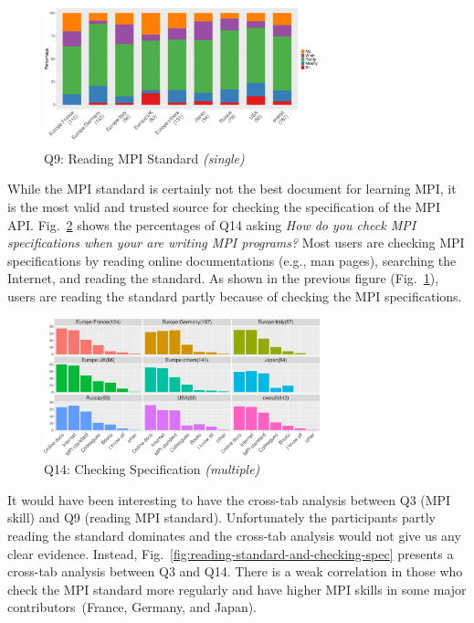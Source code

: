 \documentclass[preprint,5p,times]{elsarticle}
\def\myquote#1{{\it #1}}
\newcommand{\revision}[2]{{\color{blue}#2}}
\def\mcountries{major contributors\xspace{}}%
\begin{document}
\begin{figure}[tb]
\begin{center}
\includegraphics[width=8.0cm]{R-scripts/Q9.pdf}
\vspace{-1.5mm}
\caption{Q9: Reading MPI Standard {\it(single)}}
\label{fig:reading-standard}
\vspace{-3mm}%
\end{center}
\end{figure}

While the MPI standard is certainly not the best document for learning MPI, it
is the most valid and trusted source for checking the specification of the MPI
API. Fig.~\ref{fig:checking-spec} shows the percentages of Q14 asking
\myquote{How do you check MPI specifications when your are writing MPI
programs?} Most users are checking MPI specifications by reading online
documentations (e.g., man pages), searching the Internet, and reading the standard.
As shown in the previous figure (Fig.~\ref{fig:reading-standard}), users are
reading the standard partly because of checking the MPI specifications.

\begin{figure}[tb]
\begin{center}
\includegraphics[width=8.0cm]{R-scripts/Q14.pdf}
\vspace{-1.5mm}
\caption{Q14: Checking Specification {\it(multiple)}}
\label{fig:checking-spec}
\vspace{-3mm}%
\end{center}
\end{figure}

It would have been interesting to have the cross-tab analysis between Q3 (MPI
skill) and Q9 (reading MPI standard). Unfortunately the participants
\revision{reading the standard partly}{partly reading the standard} dominates and the cross-tab analysis would not give us any clear
evidence.
%
Instead, Fig.~\ref{fig:reading-standard-and-checking-spec} presents a cross-tab
analysis between Q3 and Q14. There is a weak correlation in those who
check the MPI standard more regularly and have higher MPI skills in some
\mcountries\  (France, Germany, and Japan).
\end{document}
